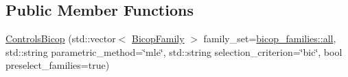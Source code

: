 \subsection*{Public Member Functions}
\begin{DoxyCompactItemize}
\item 
\hyperlink{classvinecopulib_1_1_controls_bicop_a42b951eecd5e78ffffb4b53c8de89abd}{Controls\+Bicop} (std\+::vector$<$ \hyperlink{namespacevinecopulib_a42e95cc06d33896199caab0c11ad44f3}{Bicop\+Family} $>$ family\+\_\+set=\hyperlink{namespacevinecopulib_1_1bicop__families_a5214a513f41ec23b74782aab96ea6774}{bicop\+\_\+families\+::all}, std\+::string parametric\+\_\+method=\char`\"{}mle\char`\"{}, std\+::string selection\+\_\+criterion=\char`\"{}bic\char`\"{}, bool preselect\+\_\+families=true)
\end{DoxyCompactItemize}
{\bf }\par
